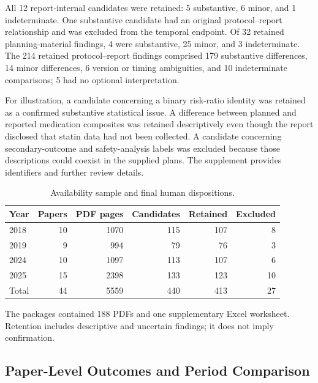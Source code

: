 \documentclass[12pt,a4paper]{article}
\begin{document}
All 12 report-internal candidates were retained: 5 substantive, 6 minor, and 1 indeterminate. One substantive candidate had an original protocol--report relationship and was excluded from the temporal endpoint. Of 32 retained planning-material findings, 4 were substantive, 25 minor, and 3 indeterminate. The 214 retained protocol--report findings comprised 179 substantive differences, 14 minor differences, 6 version or timing ambiguities, and 10 indeterminate comparisons; 5 had no optional interpretation.

For illustration, a candidate concerning a binary risk-ratio identity was retained as a confirmed substantive statistical issue. A difference between planned and reported medication composites was retained descriptively even though the report disclosed that statin data had not been collected. A candidate concerning secondary-outcome and safety-analysis labels was excluded because those descriptions could coexist in the supplied plans. The supplement provides identifiers and further review details.


\begin{table}[tbp]
\centering\small
\caption{Availability sample and final human dispositions.}
\label{tab:cohort}
\begin{tabular}{lrrrrr}
\toprule
Year & Papers & PDF pages & Candidates & Retained & Excluded \\
\midrule
2018 & 10 & 1070 & 115 & 107 & 8 \\
2019 & 9 & 994 & 79 & 76 & 3 \\
2024 & 10 & 1097 & 113 & 107 & 6 \\
2025 & 15 & 2398 & 133 & 123 & 10 \\
\midrule
Total & 44 & 5559 & 440 & 413 & 27 \\
\bottomrule
\end{tabular}
\par\smallskip\begin{minipage}{0.97\linewidth}\footnotesize The packages contained 188 PDFs and one supplementary Excel worksheet. Retention includes descriptive and uncertain findings; it does not imply confirmation.\end{minipage}
\end{table}



\subsection{Paper-Level Outcomes and Period Comparison}
\end{document}
